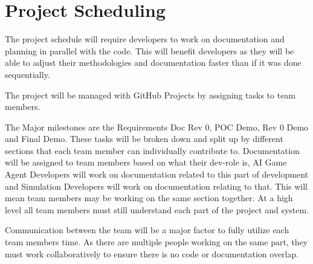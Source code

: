 \documentclass{article}
\begin{document}
\section{Project Scheduling}
The project schedule will require developers to work on documentation and planning in parallel with the code. This will benefit developers as they will be able to adjust their 
methodologies and documentation faster than if it was done sequentially.

The project will be managed with GitHub Projects by assigning tasks to team members.

The Major milestones are the Requirements Doc Rev 0, POC Demo, Rev 0 Demo and Final Demo. These tasks will be broken down and split up by different sections that each team member can individually contribute to.
Documentation will be assigned to team members based on what their dev-role is, AI Game Agent Developers will work on documentation related to this part of development and
Simulation Developers will work on documentation relating to that. This will mean team members may be working on the same section together. At a high level all team members must still understand each part of the project and system.

Communication between the team will be a major factor to fully utilize each team members time. As there are multiple people working on the same part, they must work collaboratively to ensure there is no code or documentation overlap. 
\end{document}
